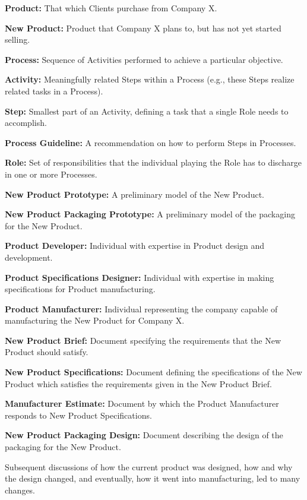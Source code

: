\documentclass[graybox,envcountchap,sectrefs]{svmono}
\begin{document}
\begin{svgraybox}
\noindent\textbf{Product:} That which Clients purchase from Company X.

\noindent\textbf{New Product:} Product that Company X plans to, but has not yet started selling.

\noindent\textbf{Process:} Sequence of Activities performed to achieve a particular objective.

\noindent\textbf{Activity:} Meaningfully related Steps within a Process (e.g., these Steps realize related tasks in a Process).

\noindent\textbf{Step:} Smallest part of an Activity, defining a task that a single Role needs to accomplish.

\noindent\textbf{Process Guideline:} A recommendation on how to perform Steps in Processes.

\noindent\textbf{Role:} Set of responsibilities that the individual playing the Role has to discharge in one or more Processes.

\noindent\textbf{New Product Prototype:} A preliminary model of the New Product.

\noindent\textbf{New Product Packaging Prototype:} A preliminary model of the packaging for the New Product.

\noindent\textbf{Product Developer:} Individual with expertise in Product design and development.

\noindent\textbf{Product Specifications Designer:} Individual with expertise in making specifications for Product manufacturing.

\noindent\textbf{Product Manufacturer:} Individual representing the company capable of manufacturing the New Product for Company X.

\noindent\textbf{New Product Brief:} Document specifying the requirements that the New Product should satisfy.

\noindent\textbf{New Product Specifications:} Document defining the specifications of the New Product which satisfies the requirements given in the New Product Brief.

\noindent\textbf{Manufacturer Estimate:} Document by which the Product Manufacturer responds to New Product Specifications.

\noindent\textbf{New Product Packaging Design:} Document describing the design of the packaging for the New Product.
\end{svgraybox}

Subsequent discussions of how the current product was designed, how and why the design changed, and eventually, how it went into manufacturing, led to many changes.
\end{document}
